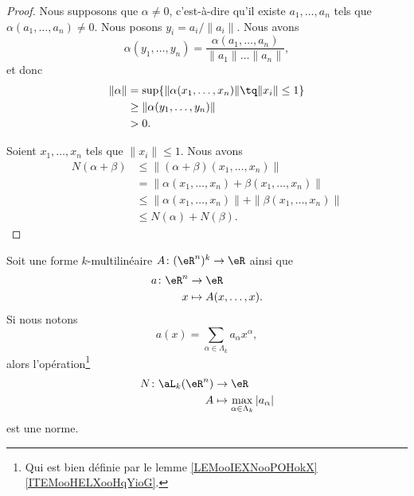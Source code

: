 \begin{proof}
	\spitem[\( N(\alpha)=0\) implique \( \alpha=0\)]
	Nous supposons que \( \alpha\neq 0\), c'est-à-dire qu'il existe \( a_1,\ldots,a_n\) tels que \( \alpha(a_1,\ldots,a_n)\neq 0\). Nous posons \( y_i=a_i/\| a_i \|\). Nous avons
	\begin{equation}
		\alpha(y_1,\ldots,y_n)=\frac{ \alpha(a_1,\ldots,a_n) }{ \| a_1 \|\ldots \| a_n \| },
	\end{equation}
	et donc
	\begin{subequations}
		\begin{align}
			\| \alpha \| & =\sup\{ \| \alpha(x_1,\ldots,x_n) \|\tq \| x_i \|\leq 1 \} \\
			             & \geq \| \alpha(y_1,\ldots,y_n) \|                          \\
			             & >0.
		\end{align}
	\end{subequations}

	Soient \( x_1,\ldots,x_n\) tels que \( \| x_i \|\leq 1\). Nous avons
	\begin{subequations}
		\begin{align}
			N(\alpha+\beta) & \leq \| (\alpha+\beta)(x_1,\ldots,x_n) \|                     \\
			                & =\| \alpha(x_1,\ldots,x_n)+\beta(x_1,\ldots,x_n) \|           \\
			                & \leq \| \alpha(x_1,\ldots,x_n) \|+\| \beta(x_1,\ldots,x_n) \| \\
			                & \leq N(\alpha)+N(\beta).
		\end{align}
	\end{subequations}
\end{proof}


\begin{lemmaDef}	\label{LEMooORANooRLJYWw}
	Soit une forme \( k\)-multilinéaire \(A \colon (\eR^n)^k\to \eR  \) ainsi que
	\begin{equation}
		\begin{aligned}
			a\colon \eR^n & \to \eR                \\
			x             & \mapsto A(x,\ldots,x).
		\end{aligned}
	\end{equation}
	Si nous notons
	\begin{equation}
		a(x)=\sum_{\alpha\in\Lambda_k}a_{\alpha}x^{\alpha},
	\end{equation}
	alors l'opération\footnote{Qui est bien définie par le lemme \ref{LEMooIEXNooPOHokX}\ref{ITEMooHELXooHqYioG}.}
	\begin{equation}
		\begin{aligned}
			N\colon \aL_k(\eR^n) & \to \eR                                            \\
			A                    & \mapsto    \max_{\alpha\in\Lambda_k}| a_{\alpha} |
		\end{aligned}
	\end{equation}
	est une norme.
\end{lemmaDef}

